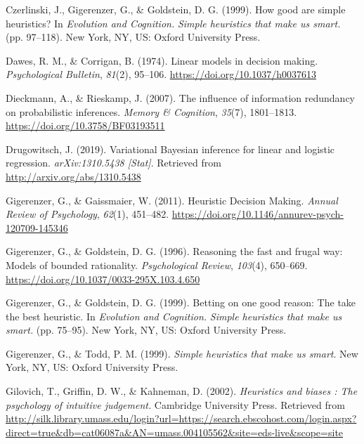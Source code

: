 \documentclass[
  english,
  man]{apa6}
\newlength{\cslhangindent}
\newenvironment{cslreferences}%
  {\setlength{\parindent}{0pt}%
  \everypar{\setlength{\hangindent}{\cslhangindent}}\ignorespaces}%
  {\par}
\begin{document}
\begin{cslreferences}
\leavevmode\hypertarget{ref-czerlinskiHowGoodAre1999}{}%
Czerlinski, J., Gigerenzer, G., \& Goldstein, D. G. (1999). How good are simple heuristics? In \emph{Evolution and Cognition.} \emph{Simple heuristics that make us smart.} (pp. 97--118). New York, NY, US: Oxford University Press.

\leavevmode\hypertarget{ref-dawesLinearModelsDecision1974}{}%
Dawes, R. M., \& Corrigan, B. (1974). Linear models in decision making. \emph{Psychological Bulletin}, \emph{81}(2), 95--106. \url{https://doi.org/10.1037/h0037613}

\leavevmode\hypertarget{ref-dieckmannInfluenceInformationRedundancy2007}{}%
Dieckmann, A., \& Rieskamp, J. (2007). The influence of information redundancy on probabilistic inferences. \emph{Memory \& Cognition}, \emph{35}(7), 1801--1813. \url{https://doi.org/10.3758/BF03193511}

\leavevmode\hypertarget{ref-drugowitschVariationalBayesianInference2019}{}%
Drugowitsch, J. (2019). Variational Bayesian inference for linear and logistic regression. \emph{arXiv:1310.5438 {[}Stat{]}}. Retrieved from \url{http://arxiv.org/abs/1310.5438}

\leavevmode\hypertarget{ref-gigerenzerHeuristicDecisionMaking2011}{}%
Gigerenzer, G., \& Gaissmaier, W. (2011). Heuristic Decision Making. \emph{Annual Review of Psychology}, \emph{62}(1), 451--482. \url{https://doi.org/10.1146/annurev-psych-120709-145346}

\leavevmode\hypertarget{ref-gigerenzerReasoningFastFrugal1996}{}%
Gigerenzer, G., \& Goldstein, D. G. (1996). Reasoning the fast and frugal way: Models of bounded rationality. \emph{Psychological Review}, \emph{103}(4), 650--669. \url{https://doi.org/10.1037/0033-295X.103.4.650}

\leavevmode\hypertarget{ref-gigerenzerBettingOneGood1999}{}%
Gigerenzer, G., \& Goldstein, D. G. (1999). Betting on one good reason: The take the best heuristic. In \emph{Evolution and Cognition.} \emph{Simple heuristics that make us smart.} (pp. 75--95). New York, NY, US: Oxford University Press.

\leavevmode\hypertarget{ref-gigerenzerSimpleHeuristicsThat1999}{}%
Gigerenzer, G., \& Todd, P. M. (1999). \emph{Simple heuristics that make us smart}. New York, NY, US: Oxford University Press.

\leavevmode\hypertarget{ref-gilovichHeuristicsBiasesPsychology2002}{}%
Gilovich, T., Griffin, D. W., \& Kahneman, D. (2002). \emph{Heuristics and biases : The psychology of intuitive judgement.} Cambridge University Press. Retrieved from \url{http://silk.library.umass.edu/login?url=https://search.ebscohost.com/login.aspx?direct=true\&db=cat06087a\&AN=umass.004105562\&site=eds-live\&scope=site}


\end{cslreferences}
\end{document}
